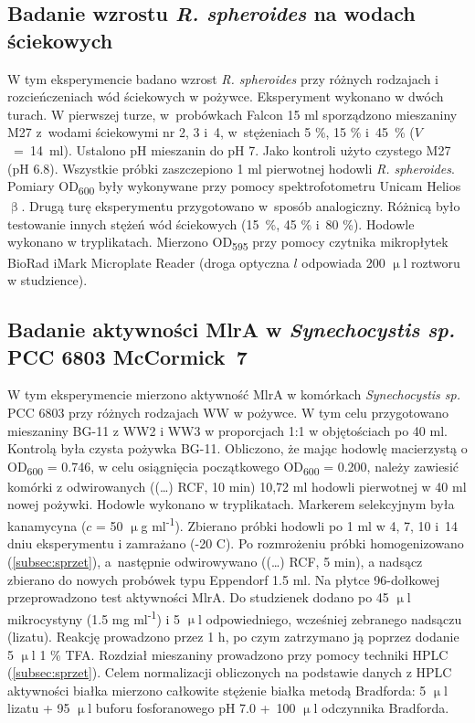 \subsection{Badanie wzrostu \textit{R. spheroides} na wodach ściekowych}\label{subsec:rhodobacter}
W tym eksperymencie badano wzrost \textit{R. spheroides} przy
różnych rodzajach i rozcieńczeniach wód ściekowych w pożywce.
Eksperyment wykonano w dwóch turach.
W pierwszej turze, w~probówkach Falcon 15 ml sporządzono
mieszaniny M27 z~wodami ściekowymi nr 2, 3 i~4,
w~stężeniach 5 \%, 15 \% i~45~\% ($V$~=~14~ml).
Ustalono pH mieszanin do pH 7.
Jako kontroli użyto czystego M27 (pH 6.8).
Wszystkie próbki zaszczepiono 1 ml pierwotnej hodowli
\textit{R. spheroides}.
Pomiary OD\textsubscript{600} były wykonywane przy pomocy
spektrofotometru Unicam Helios $\upbeta$.
Drugą turę eksperymentu przygotowano w~sposób analogiczny.
Różnicą było testowanie innych stężeń wód ściekowych
(15~\%, 45 \% i~80 \%).
Hodowle wykonano w tryplikatach.
Mierzono OD\textsubscript{595} przy pomocy czytnika
mikropłytek BioRad iMark Microplate Reader
(droga optyczna $l$ odpowiada 200 $\upmu$l roztworu w studzience).

\subsection{Badanie aktywności MlrA w \textit{Synechocystis sp.} PCC 6803 McCormick~7}\label{subsec:mlra}
W tym eksperymencie mierzono aktywność MlrA w komórkach
\textit{Synechocystis sp.} PCC 6803 przy
różnych rodzajach WW w pożywce.
W tym celu przygotowano mieszaniny BG-11 z WW2 i WW3
w proporcjach 1:1 w objętościach po 40 ml.
Kontrolą była czysta pożywka BG-11.
Obliczono, że mając hodowlę macierzystą
o OD\textsubscript{600} = 0.746, w celu osiągnięcia
początkowego OD\textsubscript{600} = 0.200, należy zawiesić
komórki z odwirowanych ((\ldots) RCF, 10 min) 10,72 ml hodowli
pierwotnej w 40 ml nowej pożywki.
Hodowle wykonano w tryplikatach.
Markerem selekcyjnym była kanamycyna ($c$ = 50 $\upmu$g ml\textsuperscript{-1}).
Zbierano próbki hodowli po 1 ml w 4, 7, 10 i~14 dniu eksperymentu
i zamrażano (-20 \degree C).
Po rozmrożeniu próbki homogenizowano (\ref{subsec:sprzet}),
a~następnie odwirowywano ((\ldots) RCF, 5 min), a nadsącz
zbierano do nowych probówek typu Eppendorf 1.5 ml.
Na płytce 96-dołkowej przeprowadzono test aktywności MlrA\@.
Do studzienek dodano po 45 $\upmu$l mikrocystyny (1.5 mg ml\textsuperscript{-1})
i 5 $\upmu$l odpowiedniego, wcześniej zebranego nadsączu (lizatu).
Reakcję prowadzono przez 1 h, po czym zatrzymano ją
poprzez dodanie 5 $\upmu$l 1 \% TFA\@.
Rozdział mieszaniny prowadzono przy pomocy techniki HPLC (\ref{subsec:sprzet}).
Celem normalizacji obliczonych na podstawie danych z HPLC aktywności białka
mierzono całkowite stężenie białka metodą Bradforda:
5 $\upmu$l lizatu + 95 $\upmu$l buforu fosforanowego pH 7.0
+~100 $\upmu$l odczynnika Bradforda.

